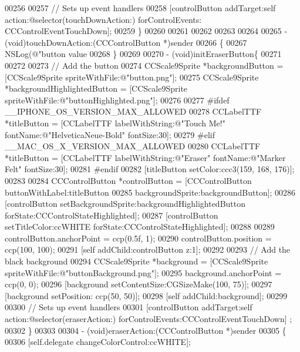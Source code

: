 \begin{DoxyCode}
{{00256     
00257     \textcolor{comment}{// Sets up event handlers}
00258     [controlButton addTarget:self action:@selector(touchDownAction:) forControlEvents:
      CCControlEventTouchDown];
00259 \}
00260 
00261 
00262 
00263 
00264 
00265 - (void)touchDownAction:(CCControlButton *)sender
00266 \{
00267     NSLog(\textcolor{stringliteral}{@"button value %
00268 \}
00269 
00270 - (void)initEraserButton\{
00271     
00272 
00273     \textcolor{comment}{// Add the button}
00274     CCScale9Sprite *backgroundButton = [CCScale9Sprite spriteWithFile:@"button.png"];
00275     CCScale9Sprite *backgroundHighlightedButton = [CCScale9Sprite spriteWithFile:@"buttonHighlighted.png"];
00276     
00277 \textcolor{preprocessor}{#ifdef \_\_IPHONE\_OS\_VERSION\_MAX\_ALLOWED}
00278 \textcolor{preprocessor}{}    CCLabelTTF *titleButton = [CCLabelTTF labelWithString:@"Touch Me!" fontName:@"HelveticaNeue-Bold" 
      fontSize:30];
00279 \textcolor{preprocessor}{#elif \_\_MAC\_OS\_X\_VERSION\_MAX\_ALLOWED}
00280 \textcolor{preprocessor}{}    CCLabelTTF *titleButton = [CCLabelTTF labelWithString:@"Eraser" fontName:@"Marker Felt" fontSize:30];
00281 \textcolor{preprocessor}{#endif}
00282 \textcolor{preprocessor}{}    [titleButton setColor:ccc3(159, 168, 176)];
00283     
00284     CCControlButton *controlButton = [CCControlButton buttonWithLabel:titleButton
00285                                                      backgroundSprite:backgroundButton];
00286     [controlButton setBackgroundSprite:backgroundHighlightedButton forState:CCControlStateHighlighted];
00287     [controlButton setTitleColor:ccWHITE forState:CCControlStateHighlighted];
00288     
00289     controlButton.anchorPoint = ccp(0.5f, 1);
00290     controlButton.position = ccp(100, 100);
00291     [\textcolor{keyword}{self} addChild:controlButton z:1];
00292     
00293     \textcolor{comment}{// Add the black background}
00294     CCScale9Sprite *background = [CCScale9Sprite spriteWithFile:@"buttonBackground.png"];
00295     background.anchorPoint =  ccp(0, 0);
00296     [background setContentSize:CGSizeMake(100, 75)];
00297     [background setPosition: ccp(50, 50)];
00298     [\textcolor{keyword}{self} addChild:background];
00299     
00300     \textcolor{comment}{// Sets up event handlers}
00301     [controlButton addTarget:self action:@selector(eraserAction:) forControlEvents:CCControlEventTouchDown]
      ;
00302 \}
00303 
00304 - (void)eraserAction:(CCControlButton *)sender
00305 \{
00306     [\textcolor{keyword}{self}.delegate changeColorControl:ccWHITE];
}}}
\end{DoxyCode}
